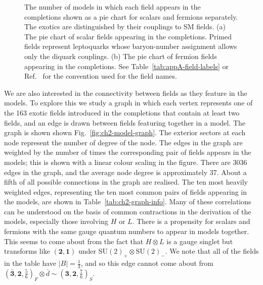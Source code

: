 \begin{figure}
  \centering
  \caption[The number of models in which each field appears in the completions
  shown as a pie chart for scalars and fermions separately.]{The number of
    models in which each field appears in the completions shown as a pie chart
    for scalars and fermions separately. The exotics are distinguished by their
    couplings to SM fields. (a) The pie chart of scalar fields appearing in the
    completions. Primed fields represent leptoquarks whose baryon-number
    assignment allows only the diquark couplings. (b) The pie chart of fermion
    fields appearing in the completions. See Table~\ref{tab:appA-field-labels}
    or Ref.~\cite{deBlas:2017xtg} for the convention used for the field names.}
  \label{fig:ch2-field-piecharts}
\end{figure}

We are also interested in the connectivity between fields as they feature in the
models. To explore this we study a graph in which each vertex represents one of
the 163 exotic fields introduced in the completions that contain at least two
fields, and an edge is drawn between fields featuring together in a model. The
graph is shown shown Fig.~\ref{fig:ch2-model-graph}. The exterior sectors at each
node represent the number of degree of the node. The edges in the graph are
weighted by the number of times the corresponding pair of fields appears in the
models; this is shown with a linear colour scaling in the figure. There are 3036
edges in the graph, and the average node degree is approximately 37. About a
fifth of all possible connections in the graph are realised. The ten most
heavily weighted edges, representing the ten most common pairs of fields
appearing in the models, are shown in Table~\ref{tab:ch2-graph-info}. Many of these
correlations can be understood on the basis of common contractions in the
derivation of the models, especially those involving $H$ or $L$. There is a
propensity for scalars and fermions with the same gauge quantum numbers to
appear in models together. This seems to come about from the fact that
$H \otimes L$ is a gauge singlet but transforms like $(\mathbf{2}, \mathbf{1})$
under $\mathrm{SU}(2)_{+} \otimes \mathrm{SU}(2)_{-}$. We note that all of the
fields in the table have $|B| = \tfrac{1}{3}$, and so this edge cannot come
about from
$(\mathbf{\bar{3}}, \mathbf{2}, \tfrac{5}{6})_{F} \otimes \bar{d} \sim (\mathbf{3}, \mathbf{2}, \tfrac{7}{6})_{S}$.

